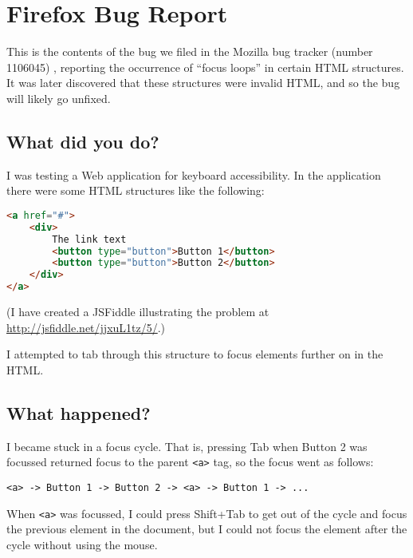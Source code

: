 \chapter{Firefox Bug Report} \label{Chapter:Firefox Bug Report}

\begin{preamble}
	This is the contents of the bug we filed in the Mozilla bug tracker (number 1106045) \citep{FirefoxFocusLoopBug}, reporting the occurrence of ``focus loops'' in certain HTML structures. It was later discovered that these structures were invalid HTML, and so the bug will likely go unfixed.
\end{preamble}

\section{What did you do?}\label{what-did-you-do}

I was testing a Web application for keyboard accessibility. In the
application there were some HTML structures like the following:

\begin{lstlisting}[language=html]
<a href="#">
    <div>
        The link text
        <button type="button">Button 1</button>
        <button type="button">Button 2</button>
    </div>
</a>
\end{lstlisting}

(I have created a JSFiddle illustrating the problem at
\url{http://jsfiddle.net/jjxuL1tz/5/}.)

I attempted to tab through this structure to focus elements further on
in the HTML.

\section{What happened?}\label{what-happened}

I became stuck in a focus cycle. That is, pressing Tab when Button 2 was
focussed returned focus to the parent
\texttt{\textless{}a\textgreater{}} tag, so the focus went as follows:

\begin{verbatim}
<a> -> Button 1 -> Button 2 -> <a> -> Button 1 -> ...
\end{verbatim}

When \texttt{\textless{}a\textgreater{}} was focussed, I could press
Shift+Tab to get out of the cycle and focus the previous element in the
document, but I could not focus the element after the cycle without
using the mouse.

